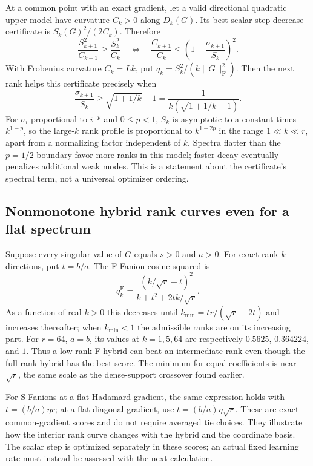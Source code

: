 \documentclass[11pt]{article}
\newcommand{\F}[1]{\lVert #1\rVert_{\mathrm F}}
\begin{document}
At a common point with an exact gradient, let a valid directional quadratic
upper model have curvature $C_k>0$ along $D_k(G)$. Its best scalar-step
decrease certificate is $S_k(G)^2/(2C_k)$. Therefore
\begin{equation}\label{eq:marginal}
 \frac{S_{k+1}^2}{C_{k+1}}\geq\frac{S_k^2}{C_k}
 \quad\Longleftrightarrow\quad
 \frac{C_{k+1}}{C_k}\leq
       \left(1+\frac{\sigma_{k+1}}{S_k}\right)^2.
\end{equation}
With Frobenius curvature $C_k=Lk$, put
$q_k=S_k^2/(k\F{G}^2)$. Then the next rank helps this certificate precisely
when
\begin{equation}\label{eq:qthreshold}
 \frac{\sigma_{k+1}}{S_k}\geq\sqrt{1+1/k}-1
 =\frac{1}{k(\sqrt{1+1/k}+1)}.
\end{equation}
For $\sigma_i$ proportional to $i^{-p}$ and $0\leq p<1$,
$S_k$ is asymptotic to a constant times $k^{1-p}$, so the large-$k$ rank
profile is proportional to $k^{1-2p}$ in the range $1\ll k\ll r$, apart
from a normalizing factor independent of $k$. Spectra flatter than the
$p=1/2$ boundary favor more ranks in this
model; faster decay eventually penalizes additional weak modes. This is a
statement about the certificate's spectral term, not a universal optimizer
ordering.

\subsection{Nonmonotone hybrid rank curves even for a flat spectrum}

Suppose every singular value of $G$ equals $s>0$ and $a>0$.
For exact rank-$k$ directions, put $t=b/a$. The F-Fanion cosine squared is
\begin{equation}\label{eq:flatFprofile}
 q_k^{\mathrm F}=
 \frac{(k/\sqrt r+t)^2}{k+t^2+2tk/\sqrt r}.
\end{equation}
As a function of real $k>0$ this decreases until
$k_{\min}=tr/(\sqrt r+2t)$ and increases thereafter; when
$k_{\min}<1$ the admissible ranks are on its increasing part.
For $r=64$, $a=b$, its values at $k=1,5,64$ are respectively
$0.5625$, $0.364224$, and $1$. Thus a low-rank F-hybrid can beat an
intermediate rank even though the full-rank hybrid has the best score.
The minimum for equal coefficients is near $\sqrt r$, the same scale as
the dense-support crossover found earlier.

For S-Fanions at a flat Hadamard gradient, the same expression holds with
$t=(b/a)\eta r$; at a flat diagonal gradient, use
$t=(b/a)\eta\sqrt r$. These are exact common-gradient scores and do not
require averaged tie choices. They illustrate how the interior rank curve
changes with the hybrid and the coordinate basis. The scalar step is
optimized separately in these scores; an actual fixed learning rate must
instead be assessed with the next calculation.
\end{document}
